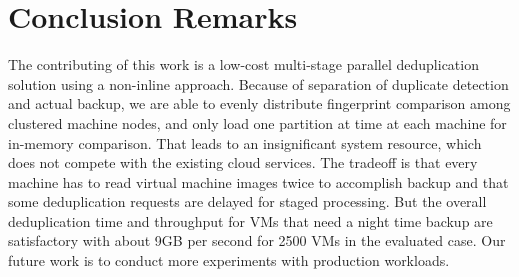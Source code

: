 \section{Conclusion Remarks}
\label{sect:final}

The contributing  of this work is a low-cost multi-stage parallel deduplication solution
using a non-inline approach. Because of separation  of duplicate detection and actual backup,
we are able to evenly distribute  fingerprint comparison among clustered machine
nodes, and only load one partition at time at each machine for in-memory comparison.
That leads to an insignificant system resource, which  does not compete with the existing cloud services.
The tradeoff is that every machine has to read virtual machine images twice to accomplish backup
and that some deduplication requests are delayed for staged processing.  But the overall 
deduplication time and throughput for VMs that need a night time backup are satisfactory 
with about 9GB per second for 2500 VMs in the evaluated case.
Our future work is to conduct more experiments with production workloads.



